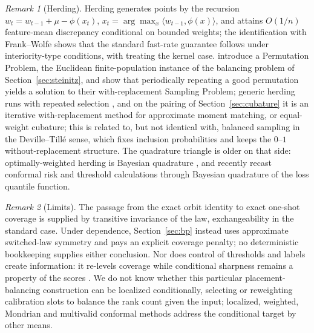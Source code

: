 \documentclass[11pt]{article}
\theoremstyle{remark}
\newtheorem{remark}{Remark}
\begin{document}
\begin{remark}[Herding]\label{rmk:herding}
Herding \citep{welling2009} generates points by the recursion $w_t=w_{t-1}+\mu-\phi(x_t)$,
$x_t=\arg\max_x\langle w_{t-1},\phi(x)\rangle$, and attains $O(1/n)$ feature-mean discrepancy
conditional on bounded weights; the identification with Frank--Wolfe \citep{bach2012} shows
that the standard fast-rate guarantee follows under interiority-type conditions, with
\citet{chen2010} treating the kernel case.
\citet{harvey2014} introduce a Permutation Problem, the Euclidean finite-population instance
of the balancing problem of Section~\ref{sec:steinitz}, and show that periodically repeating a
good permutation yields a solution to their with-replacement Sampling Problem; generic herding
runs with repeated selection \citep{welling2009,chen2010}, and on the
pairing of
Section~\ref{sec:cubature} it is an iterative with-replacement method for approximate moment
matching, or equal-weight cubature; this is related to, but not identical with, balanced
sampling in the Deville--Till\'e sense, which fixes inclusion probabilities and keeps the
$0$--$1$ without-replacement structure. The quadrature triangle is older on that side: optimally-weighted
herding is Bayesian quadrature \citep{huszar2012}, and \citet{snellgriffiths2025} recently
recast conformal risk and threshold calculations through Bayesian quadrature of the loss
quantile function.
\end{remark}

\begin{remark}[Limits]
The passage from the exact orbit identity to exact one-shot coverage is supplied by transitive
invariance of the law, exchangeability in the standard case. Under dependence,
Section~\ref{sec:bp} instead uses approximate switched-law symmetry and pays an explicit
coverage penalty; no deterministic bookkeeping supplies either conclusion. Nor does control of thresholds
and labels create information: it re-levels coverage while conditional sharpness remains a
property of the scores \citep{cotton_marginally}. We do not know whether this particular placement-balancing
construction can be localized conditionally, selecting or reweighting calibration slots to
balance the rank count given the input; localized, weighted, Mondrian and multivalid conformal
methods address the conditional target by other means.
\end{remark}



\end{document}

